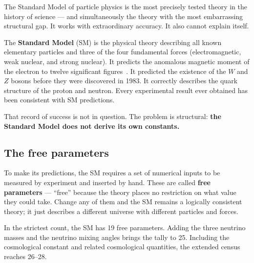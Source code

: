 \documentclass[11pt,a4paper]{article}
\newcommand{\term}[1]{\textbf{#1}}
\begin{document}
\begin{tcolorbox}[colback=boxblue,colframe=blue!40!black,
  title=The central paradox]
The Standard Model of particle physics is the most precisely tested theory
in the history of science --- and simultaneously the theory with the most
embarrassing structural gap.
It works with extraordinary accuracy.
It also cannot explain itself.
\end{tcolorbox}

The \term{Standard Model} (SM) is the physical theory describing all known
elementary particles and three of the four fundamental forces (electromagnetic,
weak nuclear, and strong nuclear).
It predicts the anomalous magnetic moment of the electron to twelve significant
figures~\cite{SpivackGTECompleteFramework}.
It predicted the existence of the $W$ and $Z$ bosons before they were discovered
in 1983.
It correctly describes the quark structure of the proton and neutron.
Every experimental result ever obtained has been consistent with SM predictions.

That record of success is not in question.
The problem is structural: \textbf{the Standard Model does not derive its own constants.}

\subsection{The free parameters}

To make its predictions, the SM requires a set of numerical inputs to be
measured by experiment and inserted by hand.
These are called \term{free parameters} --- ``free'' because the theory
places no restriction on what value they could take.
Change any of them and the SM remains a logically consistent theory;
it just describes a different universe with different particles and forces.

In the strictest count, the SM has 19 free parameters.
Adding the three neutrino masses and the neutrino mixing angles brings the
tally to 25.
Including the cosmological constant and related cosmological quantities,
the extended census reaches 26--28.
\end{document}
